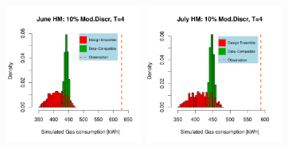 \documentclass[a4paper, 12pt]{article}
\begin{document}
\renewcommand{\scale}{12.2em}
\begin{figure}
\centering
 \includegraphics[width=\scale]{Simulation_histograms/HM_Jun-Aug/June_HM_10MD}
 \includegraphics[width=\scale]{Simulation_histograms/HM_Jun-Aug/July_HM_10MD}

\end{figure}
\end{document}
